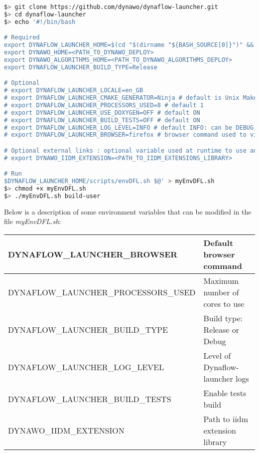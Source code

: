 \documentclass[a4paper, 12pt]{report}
\begin{document}
\begin{lstlisting}[language=bash, columns=fullflexible]
$> git clone https://github.com/dynawo/dynaflow-launcher.git
$> cd dynaflow-launcher
$> echo '#!/bin/bash

# Required
export DYNAFLOW_LAUNCHER_HOME=$(cd "$(dirname "${BASH_SOURCE[0]}")" && pwd)
export DYNAWO_HOME=<PATH_TO_DYNAWO_DEPLOY>
export DYNAWO_ALGORITHMS_HOME=<PATH_TO_DYNAWO_ALGORITHMS_DEPLOY>
export DYNAFLOW_LAUNCHER_BUILD_TYPE=Release

# Optional
# export DYNAFLOW_LAUNCHER_LOCALE=en_GB
# export DYNAFLOW_LAUNCHER_CMAKE_GENERATOR=Ninja # default is Unix Makefiles
# export DYNAFLOW_LAUNCHER_PROCESSORS_USED=8 # default 1
# export DYNAFLOW_LAUNCHER_USE_DOXYGEN=OFF # default ON
# export DYNAFLOW_LAUNCHER_BUILD_TESTS=OFF # default ON
# export DYNAFLOW_LAUNCHER_LOG_LEVEL=INFO # default INFO: can be DEBUG, INFO, WARN, ERROR
# export DYNAFLOW_LAUNCHER_BROWSER=firefox # browser command used to visualize test coverage. default: firefox

# Optional external links : optional variable used at runtime to use additional iidm extension
# export DYNAWO_IIDM_EXTENSION=<PATH_TO_IIDM_EXTENSIONS_LIBRARY>

# Run
$DYNAFLOW_LAUNCHER_HOME/scripts/envDFL.sh $@' > myEnvDFL.sh
$> chmod +x myEnvDFL.sh
$> ./myEnvDFL.sh build-user
\end{lstlisting}

Below is a description of some environment variables that can be modified in the file \textit{myEnvDFL.sh}:

\begin{center}
\begin{tabular}{|l|l|}
  \hline
   \tiny{DYNAFLOW\_LAUNCHER\_BROWSER} & \small{Default browser command} \\
  \hline
   \tiny{DYNAFLOW\_LAUNCHER\_PROCESSORS\_USED} & \small{Maximum number of cores to use} \\
  \hline
   \tiny{DYNAFLOW\_LAUNCHER\_BUILD\_TYPE} & \small{Build type: Release or Debug} \\
  \hline
   \tiny{DYNAFLOW\_LAUNCHER\_LOG\_LEVEL} & \small{Level of Dynaflow-launcher logs} \\
  \hline
   \tiny{DYNAFLOW\_LAUNCHER\_BUILD\_TESTS} & \small{Enable tests build} \\
  \hline
   \tiny{DYNAWO\_IIDM\_EXTENSION} & \small{Path to iidm extension library} \\
  \hline
\end{tabular}
\end{center}
\end{document}
